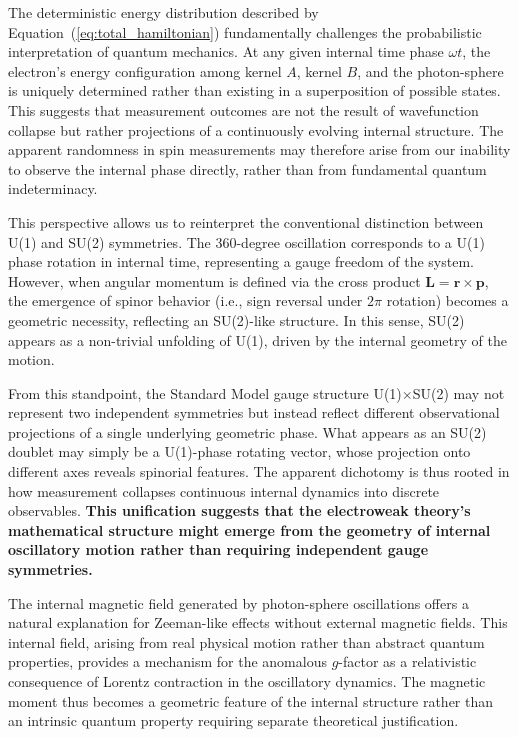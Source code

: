 \documentclass[%
 reprint,
 amsmath,amssymb,
 aps,
]{revtex4-1}
\numberwithin{equation}{section}%
\begin{document}
The deterministic energy distribution described by Equation~(\ref{eq:total_hamiltonian}) fundamentally challenges the probabilistic interpretation of quantum mechanics. At any given internal time phase $\omega t$, the electron's energy configuration among kernel $A$, kernel $B$, and the photon-sphere is uniquely determined rather than existing in a superposition of possible states. This suggests that measurement outcomes are not the result of wavefunction collapse but rather projections of a continuously evolving internal structure. The apparent randomness in spin measurements may therefore arise from our inability to observe the internal phase directly, rather than from fundamental quantum indeterminacy.

This perspective allows us to reinterpret the conventional distinction between U(1) and SU(2) symmetries. The 360-degree oscillation corresponds to a U(1) phase rotation in internal time, representing a gauge freedom of the system. However, when angular momentum is defined via the cross product $\boldsymbol{L} = \boldsymbol{r} \times \boldsymbol{p}$, the emergence of spinor behavior (i.e., sign reversal under $2\pi$ rotation) becomes a geometric necessity, reflecting an SU(2)-like structure. In this sense, SU(2) appears as a non-trivial unfolding of U(1), driven by the internal geometry of the motion.

From this standpoint, the Standard Model gauge structure U(1)$\times$SU(2) may not represent two independent symmetries but instead reflect different observational projections of a single underlying geometric phase. What appears as an SU(2) doublet may simply be a U(1)-phase rotating vector, whose projection onto different axes reveals spinorial features. The apparent dichotomy is thus rooted in how measurement collapses continuous internal dynamics into discrete observables. \textbf{This unification suggests that the electroweak theory's mathematical structure might emerge from the geometry of internal oscillatory motion rather than requiring independent gauge symmetries.}

The internal magnetic field generated by photon-sphere oscillations offers a natural explanation for Zeeman-like effects without external magnetic fields. This internal field, arising from real physical motion rather than abstract quantum properties, provides a mechanism for the anomalous $g$-factor as a relativistic consequence of Lorentz contraction in the oscillatory dynamics. The magnetic moment thus becomes a geometric feature of the internal structure rather than an intrinsic quantum property requiring separate theoretical justification.
\end{document}

